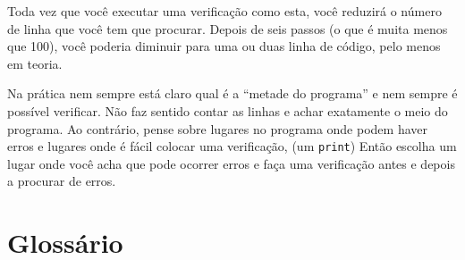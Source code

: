 Toda vez que você executar uma verificação como esta, você reduzirá o número
de linha que você tem que procurar. Depois de seis passos (o que é muita menos
que 100), você poderia diminuir para uma ou duas linha de código, pelo menos
em teoria.


Na prática nem sempre está claro qual é a ``metade do programa'' e nem sempre
é possível verificar. Não faz sentido contar as linhas e achar exatamente o
meio do programa. Ao contrário, pense sobre lugares no programa onde podem
haver erros e lugares onde é fácil colocar uma verificação, (um {\tt print})
Então escolha um lugar onde você acha que pode ocorrer erros e faça uma
verificação antes e depois a procurar de erros.

\section{Glossário}

